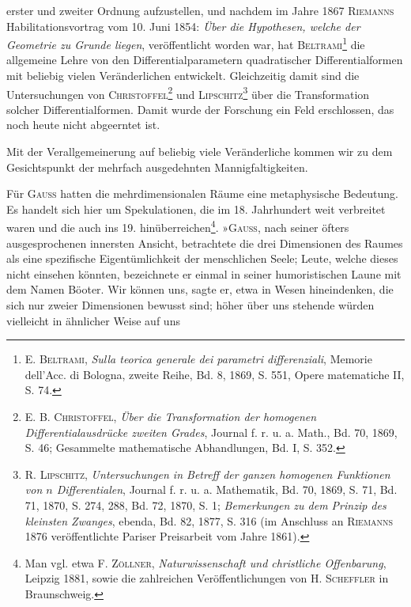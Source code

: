 erster und zweiter Ordnung aufzustellen, und nachdem im Jahre 1867 \textsc{Riemanns}
Habilitationsvortrag vom 10. Juni 1854: \textit{Über die Hypothesen, welche
der Geometrie zu Grunde liegen}, veröffentlicht worden war, hat \textsc{Beltrami}\footnote{\textsc{E. Beltrami}, \textit{Sulla teorica generale dei parametri differenziali}, Memorie dell’Acc. di Bologna, zweite Reihe, Bd. 8, 1869, S. 551, Opere matematiche II, S. 74.} die
allgemeine Lehre von den Differentialparametern quadratischer Differentialformen
mit beliebig vielen Veränderlichen entwickelt. Gleichzeitig damit sind
die Untersuchungen von \textsc{Christoffel}\footnote{\textsc{E. B. Christoffel}, \textit{Über die Transformation der homogenen Differentialausdrücke zweiten Grades}, Journal f. r. u. a. Math., Bd. 70, 1869, S. 46; Gesammelte mathematische Abhandlungen, Bd. I, S. 352.} und \textsc{Lipschitz}\footnote{\textsc{R. Lipschitz}, \textit{Untersuchungen in Betreff der ganzen homogenen Funktionen von \(n\) Differentialen}, Journal f. r. u. a. Mathematik, Bd. 70, 1869, S. 71, Bd. 71, 1870, S. 274, 288, Bd. 72, 1870, S. 1; \textit{Bemerkungen zu dem Prinzip des kleinsten Zwanges}, ebenda, Bd. 82, 1877, S. 316 (im Anschluss an \textsc{Riemanns} 1876 veröffentlichte Pariser Preisarbeit vom Jahre 1861).} über die Transformation
solcher Differentialformen. Damit wurde der Forschung ein Feld erschlossen,
das noch heute nicht abgeerntet ist.
\par
Mit der Verallgemeinerung auf beliebig viele Veränderliche kommen wir
zu dem Gesichtspunkt der mehrfach ausgedehnten Mannigfaltigkeiten.
\par
Für \textsc{Gauss} hatten die mehrdimensionalen Räume eine metaphysische Bedeutung.
Es handelt sich hier um Spekulationen, die im 18. Jahrhundert
weit verbreitet waren und die auch ins 19. hinüberreichen\footnote{Man vgl. etwa \textsc{F. Zöllner}, \textit{Naturwissenschaft und christliche Offenbarung}, Leipzig 1881, sowie die zahlreichen Veröffentlichungen von \textsc{H. Scheffler} in Braunschweig.}. »\textsc{Gauss}, nach
seiner öfters ausgesprochenen innersten Ansicht, betrachtete die drei Dimensionen
des Raumes als eine spezifische Eigentümlichkeit der menschlichen
Seele; Leute, welche dieses nicht einsehen könnten, bezeichnete er einmal in
seiner humoristischen Laune mit dem Namen Böoter. Wir können uns, sagte
er, etwa in Wesen hineindenken, die sich nur zweier Dimensionen bewusst
\clearpage{}\setcounter{footnote}{0}
\noindent sind; höher über uns stehende würden vielleicht in ähnlicher Weise auf uns
